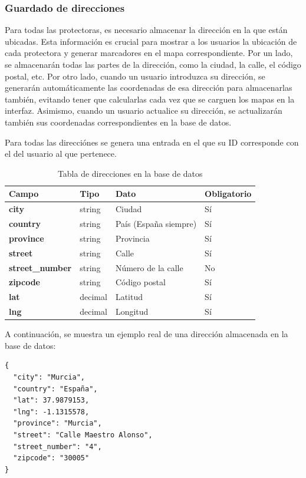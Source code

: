\documentclass[a4paper, 12pt]{article}
\begin{document}
\subsubsection{Guardado de direcciones}

Para todas las protectoras, es necesario almacenar la dirección en la que están ubicadas. Esta información es crucial para mostrar a los usuarios la ubicación de cada protectora y generar marcadores en el mapa correspondiente. Por un lado, se almacenarán todas las partes de la dirección, como la ciudad, la calle, el código postal, etc. Por otro lado, cuando un usuario introduzca su dirección, se generarán automáticamente las coordenadas de esa dirección para almacenarlas también, evitando tener que calcularlas cada vez que se carguen los mapas en la interfaz. Asimismo, cuando un usuario actualice su dirección, se actualizarán también sus coordenadas correspondientes en la base de datos.

Para todas las direcciónes se genera una entrada en el que su ID corresponde con el del usuario al que pertenece.

\begin{table}[H]
\label{tab:Addresses}
	\begin{tabular}{|m{3cm}|m{2cm}|m{5cm}|m{3cm}|}
	\hline
	\textbf{Campo} & \textbf{Tipo} & \textbf{Dato} & \textbf{Obligatorio} \\ 
	\hline
	\textbf{city} & string & Ciudad & Sí \\ 
	\hline
	\textbf{country} & string & País (España siempre) & Sí \\ 
	\hline
	\textbf{province} &  string & Provincia & Sí \\ 
	\hline
	\textbf{street} &  string & Calle &  Sí \\ 
	\hline
	\textbf{street\_number} &  string & Número de la calle & No\\ 
	\hline
	\textbf{zipcode} & string & Código postal &  Sí \\ 
	\hline
	\textbf{lat} & decimal & Latitud & Sí \\ 
	\hline
	\textbf{lng} & decimal & Longitud &  Sí \\ 
	\hline
\end{tabular}
\caption{Tabla de direcciones en la base de datos}
\end{table}

A continuación, se muestra un ejemplo real de una dirección almacenada en la base de datos:

\begin{verbatim}
{
  "city": "Murcia",
  "country": "España",
  "lat": 37.9879153,
  "lng": -1.1315578,
  "province": "Murcia",
  "street": "Calle Maestro Alonso",
  "street_number": "4",
  "zipcode": "30005"
}
\end{verbatim}
\end{document}
